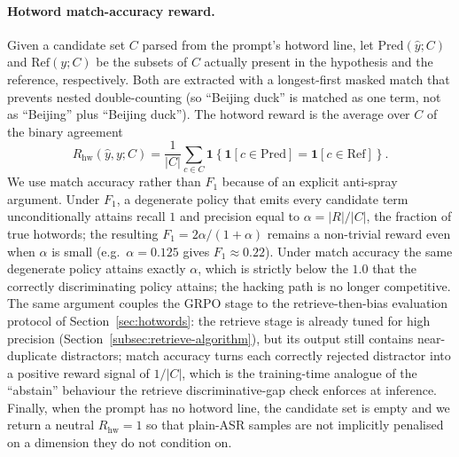 \paragraph{Hotword match-accuracy reward.}
Given a candidate set $C$ parsed from the prompt's hotword line,
let $\mathrm{Pred}(\hat{y}; C)$ and $\mathrm{Ref}(y; C)$ be the
subsets of $C$ actually present in the hypothesis and the
reference, respectively. Both are extracted with a longest-first
masked match that prevents nested double-counting (so ``Beijing
duck'' is matched as one term, not as ``Beijing'' plus ``Beijing
duck''). The hotword reward is the average over $C$ of the binary
agreement
\begin{equation}
  R_\mathrm{hw}(\hat{y}, y; C) = \frac{1}{|C|}\sum_{c \in C}
    \mathbf{1}\!\left\{\mathbf{1}[c \in \mathrm{Pred}] = \mathbf{1}[c \in \mathrm{Ref}]\right\}.
  \label{eq:reward-hw}
\end{equation}
We use match accuracy rather than $F_1$ because of an explicit
anti-spray argument. Under $F_1$, a degenerate policy that emits
every candidate term unconditionally attains recall $1$ and
precision equal to $\alpha = |R| / |C|$, the fraction of true
hotwords; the resulting $F_1 = 2\alpha / (1 + \alpha)$ remains a
non-trivial reward even when $\alpha$ is small (e.g.\ $\alpha=0.125$
gives $F_1\!\approx\!0.22$). Under match accuracy the same
degenerate policy attains exactly $\alpha$, which is strictly below
the $1.0$ that the correctly discriminating policy attains; the
hacking path is no longer competitive. The same argument couples
the GRPO stage to the retrieve-then-bias evaluation protocol of
Section~\ref{sec:hotwords}: the retrieve stage is already tuned for
high precision (Section~\ref{subsec:retrieve-algorithm}), but its
output still contains near-duplicate distractors; match accuracy
turns each correctly rejected distractor into a positive reward
signal of $1/|C|$, which is the training-time analogue of the
``abstain'' behaviour the retrieve discriminative-gap check
enforces at inference. Finally, when the prompt has no hotword line,
the candidate set is empty and we return a neutral
$R_\mathrm{hw}=1$ so that plain-ASR samples are not implicitly
penalised on a dimension they do not condition on.


